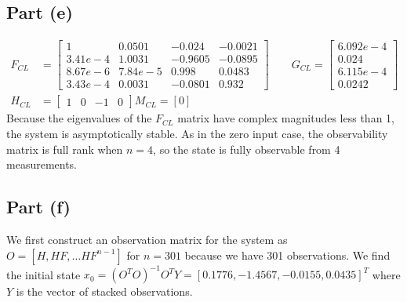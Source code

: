 \documentclass[11pt]{article}
\begin{document}
\subsection*{Part (e)}
\begin{align*}
	F_{CL}&= \begin{bmatrix} 1 & 0.0501 & -0.024 & -0.0021 \\
							 3.41e-4 & 1.0031 & -0.9605 & -0.0895 \\
							 8.67e-6 & 7.84e-5 & 0.998 & 0.0483 \\
							 3.43e-4 & 0.0031 & -0.0801 & 0.932 \end{bmatrix} \qquad
	G_{CL} = \begin{bmatrix} 6.092e-4 \\ 0.024 \\ 6.115e-4 \\ 0.0242 
			 \end{bmatrix} \\
	H_{CL}&= \begin{bmatrix} 1 & 0 & -1 & 0 \end{bmatrix}
	M_{CL} = [0]
\end{align*}
Because the eigenvalues of the $F_{CL}$ matrix have complex magnitudes less than 1, the system is asymptotically stable. As in the zero input case, the observability matrix is full rank when $n=4$, so the state is fully observable from 4 measurements.

\subsection*{Part (f)}
We first construct an observation matrix for the system as $O=[H, HF, \dots HF^{n-1}]$ for $n=301$ because we have 301 observations. We find the initial state $x_0 = (O^TO)^{-1}O^TY = [0.1776,-1.4567,-0.0155,0.0435]^T$ where $Y$ is the vector of stacked observations. 
\end{document}
